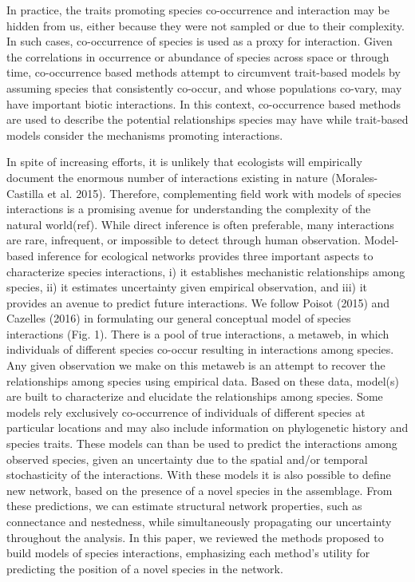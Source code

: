 In practice, the traits promoting species co-occurrence and interaction may be
hidden from us, either because they were not sampled or due to their complexity.
In such cases, co-occurrence of species is used as a proxy for interaction.
Given the correlations in occurrence or abundance of species across space or
through time, co-occurrence based methods attempt to circumvent trait-based
models by assuming species that consistently co-occur, and whose populations
co-vary, may have important biotic interactions. In this context, co-occurrence
based methods are used to describe the potential relationships species may have
while trait-based models consider the mechanisms promoting interactions.

In spite of increasing efforts, it is unlikely that ecologists will empirically
document the enormous number of interactions existing in nature
(Morales-Castilla et al. 2015). Therefore, complementing field work with models
of species interactions is a promising avenue for understanding the complexity
of the natural world(ref). While direct inference is often preferable, many
interactions are rare, infrequent, or impossible to detect through human
observation. Model-based inference for ecological networks provides three
important aspects to characterize species interactions, i) it establishes
mechanistic relationships among species, ii) it estimates uncertainty given
empirical observation, and iii) it provides an avenue to predict future
interactions. We follow Poisot (2015) and Cazelles (2016) in formulating our
general conceptual model of species interactions (Fig. 1). There is a pool of
true interactions, a metaweb, in which individuals of different species co-occur
resulting in interactions among species. Any given observation we make on this
metaweb is an attempt to recover the relationships among species using empirical
data. Based on these data, model(s) are built to characterize and elucidate the
relationships among species. Some models rely exclusively co-occurrence of
individuals of different species at particular locations and may also include
information on phylogenetic history and species traits. These models can than be
used to predict the interactions among observed species, given an uncertainty
due to the spatial and/or temporal stochasticity of the interactions. With these
models it is also possible to define new network, based on the presence of a
novel species in the assemblage. From these predictions, we can estimate
structural network properties, such as connectance and nestedness, while
simultaneously propagating our uncertainty throughout the analysis. In this
paper, we reviewed the methods proposed to build models of species interactions,
emphasizing each method's utility for predicting the position of a novel species
in the network.

